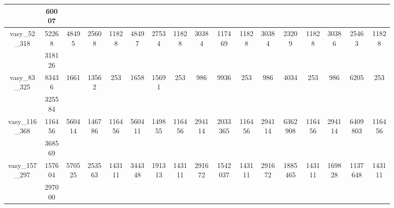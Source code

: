 \documentclass[../master/master.tex]{subfiles}
\begin{document}
\begin{figure}
\begin{adjustbox}{angle=90}
\begin{tabular}{ |c|c||c|c|c||c|c|c||c|c|c||c|c|c||c|c|c|| }
\cline{2-2}
 & 60007  &  &  &  &  &  &  &  &  &  &  &  &  &  &  &  \\
\hline
\multirow{2}{3.4em}{vasy\_52\_318} & 52268 & \multirow{2}{3.4em}{48495} & \multirow{2}{3.4em}{25608} & \multirow{2}{3.4em}{11828} & \multirow{2}{3.4em}{48497} & \multirow{2}{3.4em}{27534} & \multirow{2}{3.4em}{11828} & \multirow{2}{3.4em}{30384} & \multirow{2}{3.4em}{117469} & \multirow{2}{3.4em}{11828} & \multirow{2}{3.4em}{30384} & \multirow{2}{3.4em}{23209} & \multirow{2}{3.4em}{11828} & \multirow{2}{3.4em}{30386} & \multirow{2}{3.4em}{25463} & \multirow{2}{3.4em}{11828} \\
\cline{2-2}
 & 318126  &  &  &  &  &  &  &  &  &  &  &  &  &  &  &  \\
\hline
\multirow{2}{3.4em}{vasy\_83\_325} & 83436 & \multirow{2}{3.4em}{1661} & \multirow{2}{3.4em}{13562} & \multirow{2}{3.4em}{253} & \multirow{2}{3.4em}{1658} & \multirow{2}{3.4em}{15691} & \multirow{2}{3.4em}{253} & \multirow{2}{3.4em}{986} & \multirow{2}{3.4em}{9936} & \multirow{2}{3.4em}{253} & \multirow{2}{3.4em}{986} & \multirow{2}{3.4em}{4034} & \multirow{2}{3.4em}{253} & \multirow{2}{3.4em}{986} & \multirow{2}{3.4em}{6205} & \multirow{2}{3.4em}{253} \\
\cline{2-2}
 & 325584  &  &  &  &  &  &  &  &  &  &  &  &  &  &  &  \\
\hline
\multirow{2}{3.4em}{vasy\_116\_368} & 116456 & \multirow{2}{3.4em}{560414} & \multirow{2}{3.4em}{146786} & \multirow{2}{3.4em}{116456} & \multirow{2}{3.4em}{560411} & \multirow{2}{3.4em}{149855} & \multirow{2}{3.4em}{116456} & \multirow{2}{3.4em}{294114} & \multirow{2}{3.4em}{2033365} & \multirow{2}{3.4em}{116456} & \multirow{2}{3.4em}{294114} & \multirow{2}{3.4em}{6362908} & \multirow{2}{3.4em}{116456} & \multirow{2}{3.4em}{294114} & \multirow{2}{3.4em}{6409803} & \multirow{2}{3.4em}{116456} \\
\cline{2-2}
 & 368569  &  &  &  &  &  &  &  &  &  &  &  &  &  &  &  \\
\hline
\multirow{2}{3.4em}{vasy\_157\_297} & 157604 & \multirow{2}{3.4em}{570525} & \multirow{2}{3.4em}{253563} & \multirow{2}{3.4em}{143111} & \multirow{2}{3.4em}{344348} & \multirow{2}{3.4em}{191313} & \multirow{2}{3.4em}{143111} & \multirow{2}{3.4em}{291672} & \multirow{2}{3.4em}{1542037} & \multirow{2}{3.4em}{143111} & \multirow{2}{3.4em}{291672} & \multirow{2}{3.4em}{1885465} & \multirow{2}{3.4em}{143111} & \multirow{2}{3.4em}{169828} & \multirow{2}{3.4em}{1137648} & \multirow{2}{3.4em}{143111} \\
\cline{2-2}
 & 297000  &  &  &  &  &  &  &  &  &  &  &  &  &  &  &  \\

\end{tabular}
\end{adjustbox}
\end{figure}
\end{document}
